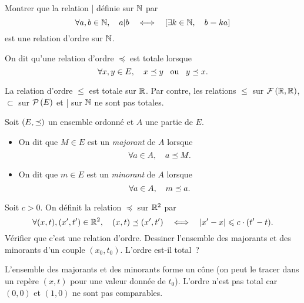 \documentclass{magnolia}
\begin{document}
\begin{exoUnique}
\exo Montrer que la relation | définie sur $\mathbb{N}$ par
  \[\forall a,b\in\mathbb{N} ,\quad a|b \quad\Longleftrightarrow\quad \left[\exists k\in\mathbb{N} ,\quad b=ka\right]\]
  est une relation d'ordre sur $\mathbb{N}$.
\end{exoUnique}


\begin{definition}[utile=-3]
On dit qu'une relation d'ordre $\preceq$ est totale lorsque
\[\forall x,y\in E ,\quad x\preceq y \quad\!\text{ou}\quad\! y\preceq x.\]
\end{definition}

\begin{remarqueUnique}
\remarque La relation d'ordre $\leq$ est totale sur $\mathbb{R}$. Par contre, les
  relations $\leq$ sur $\mathcal{F}\left(\mathbb{R},\mathbb{R}\right)$, $\subset$ sur $\mathcal{P}\left(E\right)$ et
  | sur $\mathbb{N}$ ne sont pas totales.
\end{remarqueUnique}


\begin{definition}[utile=-3]
Soit $\left(E,\preceq\right)$ un ensemble ordonné et $A$ une partie de $E$.
\begin{itemize}
\item On dit que $M\in E$ est un \emph{majorant} de $A$ lorsque
  \[\forall a\in A ,\quad a\preceq M.\]
\item On dit que $m\in E$ est un \emph{minorant} de $A$ lorsque
  \[\forall a\in A ,\quad m\preceq a.\]
\end{itemize}
\end{definition}

\begin{exoUnique}
\exo Soit $c>0$. On définit la relation $\preceq$ sur $\mathbb{R}^2$ par
  \[\forall (x,t),(x',t')\in\mathbb{R}^2 ,\quad (x,t)\preceq (x',t')\quad\Longleftrightarrow\quad \left|x'-x\right|\leqslant c\cdot (t'-t).\]
  Vérifier que c'est une relation d'ordre. Dessiner l'ensemble des majorants et
  des minorants d'un couple $(x_0,t_0)$. L'ordre est-il total~?
  \begin{sol}
  L'ensemble des majorants et des minorants forme un cône (on peut le tracer dans un repère $(x,t)$ pour une valeur donnée de $t_0$). L'ordre n'est pas
  total car $(0,0)$ et $(1,0)$ ne sont pas comparables.
  \end{sol}
\end{exoUnique}
\end{document}
